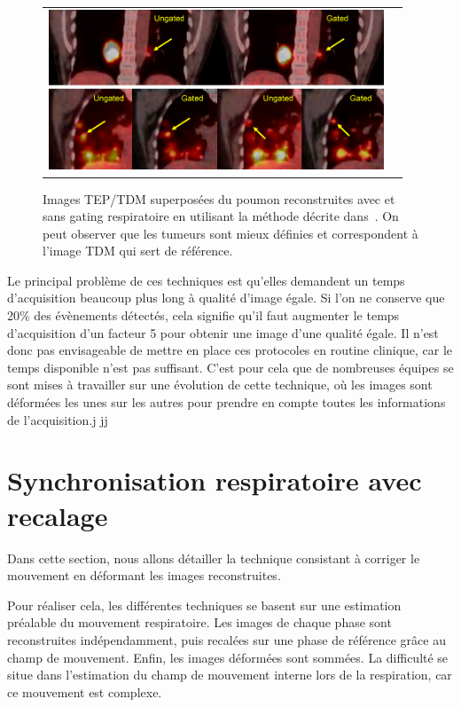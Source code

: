 \begin{figure}[h!]
	\begin{center}
		\begin{tabular}{c c}
			\includegraphics[width=10cm]{images/chang2010}
		\end{tabular}
	\end{center}
	\caption{Images TEP/TDM superposées du poumon reconstruites avec et sans gating respiratoire en utilisant la méthode décrite dans~\cite{GuopingChang2010Implementation}. On peut observer que les tumeurs sont mieux définies et correspondent à l'image TDM qui sert de référence.} 
	\label{fig:chang2010}
\end{figure}

Le principal problème de ces techniques est qu'elles demandent un temps d'acquisition beaucoup plus long à qualité d'image égale. Si l'on ne conserve que 20\% des évènements détectés, cela signifie qu'il faut augmenter le temps d'acquisition d'un facteur 5 pour obtenir une image d'une qualité égale. Il n'est donc pas envisageable de mettre en place ces protocoles en routine clinique, car le temps disponible n'est pas suffisant. C'est pour cela que de nombreuses équipes se sont mises à travailler sur une évolution de cette technique, où les images sont déformées les unes sur les autres pour prendre en compte toutes les informations de l'acquisition.j jj

\section{Synchronisation respiratoire avec recalage}
\label{lab:corrPostRecon}

Dans cette section, nous allons détailler la technique consistant à corriger  le mouvement en déformant les images reconstruites.

Pour réaliser cela, les différentes techniques se basent sur une estimation préalable du mouvement respiratoire. Les images de chaque phase sont reconstruites indépendamment, puis recalées sur une phase de référence grâce au champ de mouvement. Enfin, les images déformées sont sommées. La difficulté se situe dans l'estimation du champ de mouvement interne lors de la respiration, car ce mouvement est complexe.

